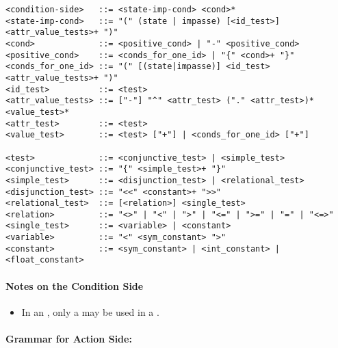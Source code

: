 \begin{verbatim}
<condition-side>   ::= <state-imp-cond> <cond>*
<state-imp-cond>   ::= "(" (state | impasse) [<id_test>]
<attr_value_tests>+ ")"
<cond>             ::= <positive_cond> | "-" <positive_cond>
<positive_cond>    ::= <conds_for_one_id> | "{" <cond>+ "}"
<conds_for_one_id> ::= "(" [(state|impasse)] <id_test> 
<attr_value_tests>+ ")"
<id_test>          ::= <test>
<attr_value_tests> ::= ["-"] "^" <attr_test> ("." <attr_test>)*
<value_test>*
<attr_test>        ::= <test>
<value_test>       ::= <test> ["+"] | <conds_for_one_id> ["+"]  

<test>             ::= <conjunctive_test> | <simple_test>
<conjunctive_test> ::= "{" <simple_test>+ "}"
<simple_test>      ::= <disjunction_test> | <relational_test>
<disjunction_test> ::= "<<" <constant>+ ">>"
<relational_test>  ::= [<relation>] <single_test>
<relation>         ::= "<>" | "<" | ">" | "<=" | ">=" | "=" | "<=>"
<single_test>      ::= <variable> | <constant>
<variable>         ::= "<" <sym_constant> ">"
<constant>         ::= <sym_constant> | <int_constant> | <float_constant>
\end{verbatim}

\paragraph*{Notes on the Condition Side}

\vspace{-12pt}
\begin{itemize}
	\item In an , only a  may be used in a .
\end{itemize}





\paragraph{Grammar for Action Side:}
\label{SYNTAX-pm-actgrammar}

